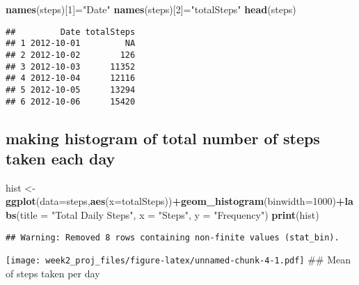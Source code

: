 \documentclass[]{article}
\newenvironment{Shaded}{\begin{snugshade}}{\end{snugshade}}
\newcommand{\KeywordTok}[1]{\textcolor[rgb]{0.13,0.29,0.53}{\textbf{#1}}}
\newcommand{\DataTypeTok}[1]{\textcolor[rgb]{0.13,0.29,0.53}{#1}}
\newcommand{\DecValTok}[1]{\textcolor[rgb]{0.00,0.00,0.81}{#1}}
\newcommand{\StringTok}[1]{\textcolor[rgb]{0.31,0.60,0.02}{#1}}
\newcommand{\OtherTok}[1]{\textcolor[rgb]{0.56,0.35,0.01}{#1}}
\newcommand{\OperatorTok}[1]{\textcolor[rgb]{0.81,0.36,0.00}{\textbf{#1}}}
\newcommand{\NormalTok}[1]{#1}
\begin{document}
\begin{Shaded}
\begin{Highlighting}[]
\KeywordTok{names}\NormalTok{(steps)[}\DecValTok{1}\NormalTok{]=}\StringTok{"Date"}
\KeywordTok{names}\NormalTok{(steps)[}\DecValTok{2}\NormalTok{]=}\StringTok{"totalSteps"}
\KeywordTok{head}\NormalTok{(steps)}
\end{Highlighting}
\end{Shaded}

\begin{verbatim}
##         Date totalSteps
## 1 2012-10-01         NA
## 2 2012-10-02        126
## 3 2012-10-03      11352
## 4 2012-10-04      12116
## 5 2012-10-05      13294
## 6 2012-10-06      15420
\end{verbatim}

\subsection{making histogram of total number of steps taken each
day}\label{making-histogram-of-total-number-of-steps-taken-each-day}

\begin{Shaded}
\begin{Highlighting}[]
\NormalTok{hist <-}\StringTok{ }\KeywordTok{ggplot}\NormalTok{(}\DataTypeTok{data=}\NormalTok{steps,}\KeywordTok{aes}\NormalTok{(}\DataTypeTok{x=}\NormalTok{totalSteps))}\OperatorTok{+}\KeywordTok{geom_histogram}\NormalTok{(}\DataTypeTok{binwidth=}\DecValTok{1000}\NormalTok{)}\OperatorTok{+}\KeywordTok{labs}\NormalTok{(}\DataTypeTok{title =} \StringTok{"Total  Daily Steps"}\NormalTok{, }\DataTypeTok{x =} \StringTok{"Steps"}\NormalTok{, }\DataTypeTok{y =} \StringTok{"Frequency"}\NormalTok{)}
\KeywordTok{print}\NormalTok{(hist)}
\end{Highlighting}
\end{Shaded}

\begin{verbatim}
## Warning: Removed 8 rows containing non-finite values (stat_bin).
\end{verbatim}

\texttt{[image: week2\_proj\_files/figure-latex/unnamed-chunk-4-1.pdf]}
\#\# Mean of steps taken per day

\begin{Shaded}
\end{Shaded}
\end{document}
